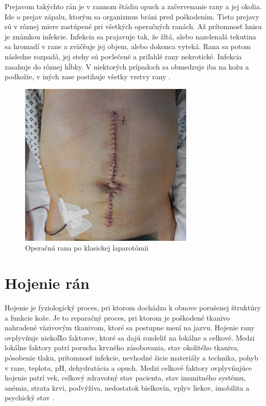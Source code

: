 Prejavom takýchto rán je v rannom štádiu opuch a začervenanie rany a jej okolia. Ide o prejav zápalu, ktorým sa organizmus bráni pred poškodením. Tieto prejavy sú v rôznej miere zastúpené pri všetkých operačných ranách. Až prítomnosť hnisu je známkou infekcie. Infekcia sa prajavuje tak, že žltá, alebo nazelenalá tekutina sa hromadí v rane a zväčšuje jej objem, alebo dokonca vyteká. Rana sa potom následne rozpadá, jej stehy sú povlečené a priľahlé rany nekrotické. Infekcia zasahuje do rôznej hĺbky. V niektorých prípadoch sa obmedzuje iba na kožu a podkožie, v iných zase postihuje všetky vrstvy rany \cite{pcCdSrbbhhlr5YcQ}.
\begin{figure}[h]
  \centering
  \includegraphics[scale=1]{fig/pooperacna-rana.png}
  \caption{Operačná rana po klasickej laparotómii \cite{XUKYT8x1LmEzzkqO}}
  \label{fig:pooperacna-rana}
\end{figure}

\section{Hojenie rán}
Hojenie je fyziologický proces, pri ktorom dochádza k obnove porušenej štruktúry a funkcie kože. Je to reparačný proces, pri ktorom je poškodené tkanivo nahradené väzivovým tkanivom, ktoré sa postupne mení na jazvu. Hojenie rany ovplyvňuje niekoľǩo faktorov, ktoré sa dajú rozdeliť na lokálne a celkové. Medzi lokálne faktory patrí porucha krvného zásobovania, stav okolitého tkaniva, pôsobenie tlaku, prítomnosť infekcie, nevhodné šicie materiály a technika, pohyb v rane, teplota, pH, dehydratácia a opuch. Medzi celkové faktory ovplyvňujúce hojenie patrí vek, celkový zdravotný stav pacienta, stav imunitného systému, anémia, strata krvi, podvýživa, nedostatok bielkovín, vplyv liekov, imobilita a psychický stav \cite{pcCdSrbbhhlr5YcQ, Pokorna2012}.

